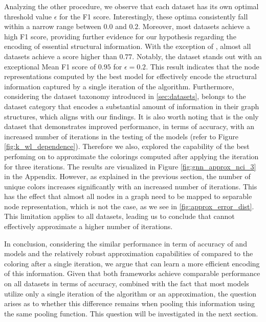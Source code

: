 Analyzing the other procedure, we observe that each dataset has its own optimal threshold value $\epsilon$ for the F1 score. Interestingly, these optima consistently fall within a narrow range between $0.0$ and $0.2$. Moreover, most datasets achieve a high F1 score, providing further evidence for our hypothesis regarding the encoding of essential structural information. With the exception of \reddit, almost all datasets achieve a score higher than $0.77$. Notably, the \nci dataset stands out with an exceptional Mean F1 score of $0.95$ for $\epsilon = 0.2$. This result indicates that the node representations computed by the best \gnn model for \nci effectively encode the structural information captured by a single iteration of the \wl algorithm. Furthermore, considering the dataset taxonomy introduced in \cref{sec:datasets}, \nci belongs to the dataset category that encodes a substantial amount of information in their graph structures, which aligns with our findings.
It is also worth noting that \nci is the only dataset that demonstrates improved performance, in terms of accuracy, with an increased number of \wl iterations in the testing of the \wlnn models (refer to Figure \ref{fig:k_wl_dependence}). Therefore we also, explored the capability of the best perfoming \gnn on \nci to approximate the colorings computed after applying the \wl iteration for three iterations. The results are visualized in Figure \ref{fig:gnn_approx_nci_3} in the Appendix. However, as explained in the previous section, the number of unique colors increases significantly with an increased number of \wl iterations. This has the effect that almost all nodes in a graph need to be mapped to separable node representation, which is not the case, as we see in \cref{fig:approx_error_dist}. This limitation applies to all datasets, leading us to conclude that \gnns cannot effectively approximate a higher number of \wl iterations.

In conclusion, considering the similar performance in term of accuracy of \gnn and \wlnn models and the relatively robust approximation capabilities of \gnns compared to the \wl coloring after a single iteration, we argue that \gnns can learn a more efficient encoding of this information. Given that both frameworks achieve comparable performance on all datasets in terms of accuracy, combined with the fact that most models utilize only a single iteration of the \wl algorithm or an approximation, the question arises as to whether this difference remains when pooling this information using the same pooling function. This question will be investigated in the next section.

